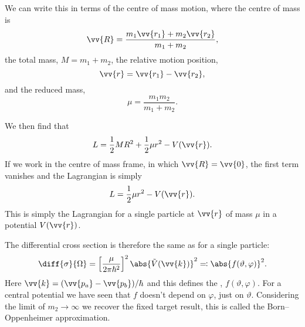 \documentclass[fleqn]{NotesClass}
\newcommand*{\lagrangian}{L}
\begin{document}
    We can write this in terms of the centre of mass motion, where the centre of mass is
    \begin{equation}
        \vv{R} = \frac{m_1\vv{r_1} + m_2\vv{r_2}}{m_1 + m_2},
    \end{equation}
    the total mass, \(M = m_1 + m_2\), the relative motion position,
    \begin{equation}
        \vv{r} = \vv{r_1} - \vv{r_2},
    \end{equation}
    and the reduced mass,
    \begin{equation}
        \mu = \frac{m_1m_2}{m_1 + m_2}.
    \end{equation}
    
    We then find that
    \begin{equation}
        \lagrangian = \frac{1}{2}MR^2 + \frac{1}{2}\mu r^2 - V(\vv{r}).
    \end{equation}
    If we work in the centre of mass frame, in which \(\vv{R} = \vv{0}\), the first term vanishes and the Lagrangian is simply
    \begin{equation}
        \lagrangian = \frac{1}{2}\mu r^2 - V(\vv{r}).
    \end{equation}
    This is simply the Lagrangian for a single particle at \(\vv{r}\) of mass \(\mu\) in a potential \(V(\vv{r})\).
    
    The differential cross section is therefore the same as for a single particle:
    \begin{equation}
        \diff{\sigma}{\Omega} = \left[ \frac{\mu}{2\pi\hbar^2} \right]^{2} \abs{\tilde{V}(\vv{k})}^2 \eqqcolon \abs{f(\vartheta, \varphi)}^2.
    \end{equation}
    Here \(\vv{k} = (\vv{p_a} - \vv{p_b})/\hbar\) and this defines the , \(f(\vartheta, \varphi)\).
    For a central potential we have seen that \(f\) doesn't depend on \(\varphi\), just on \(\vartheta\).
    Considering the limit of \(m_2 \to \infty\) we recover the fixed target result, this is called the Born--Oppenheimer approximation.
    
\end{document}
